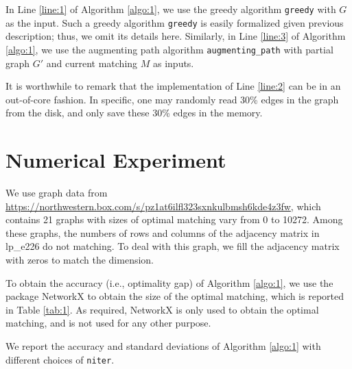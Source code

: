 \documentclass{article}
\begin{document}
In Line \ref{line:1} of Algorithm \ref{algo:1}, we  use  the greedy     algorithm \texttt{greedy} with $G$ as  the input.   Such a greedy     algorithm \texttt{greedy}  is easily  formalized  given previous  description; thus,  we omit  its details here.   Similarly, in Line \ref{line:3} of Algorithm \ref{algo:1},   we  use  the augmenting path  algorithm \texttt{augmenting\_path} with partial graph $G'$  and  current matching $M$ as  inputs.    

It is worthwhile to  remark that  the implementation of   Line \ref{line:2}   can be  in an out-of-core fashion.  In specific,  one may   randomly  read  30\% edges  in the graph   from the disk,  and only  save  these 30\%  edges in  the memory.  


\section{Numerical Experiment}\label{sec:num}

We   use graph data from  \url{https://northwestern.box.com/s/pz1at6ilfl323sxnkulbmsh6kde4z3fw}, which contains 21 graphs  with sizes of  optimal  matching vary from 0 to 10272.    Among these graphs,  the numbers of rows and columns of the  adjacency matrix  in   lp\_e226   do not matching.  To deal with this graph,  we  fill the adjacency  matrix  with zeros  to   match the dimension.  

To  obtain   the accuracy (i.e., optimality gap) of Algorithm \ref{algo:1},  we  use the package {NetworkX} \citep{hagberg2008exploring} to  obtain the size of the optimal  matching,  which is reported in Table \ref{tab:1}.    As required,  NetworkX  is only used to  obtain the optimal  matching, and is not used  for  any other purpose.  

We report the accuracy and standard deviations of  Algorithm \ref{algo:1}  with different choices  of \texttt{niter}.  
\end{document}
